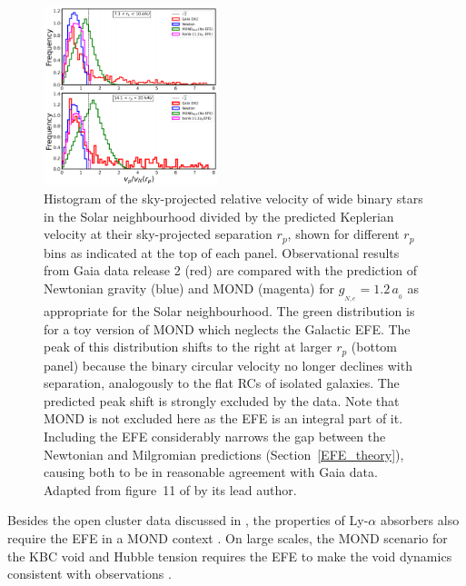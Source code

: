 \documentclass[fleqn,usenatbib,useAMS]{mnras} %
\begin{document}
\begin{figure}
	\centering
	\includegraphics[width=0.45\textwidth]{Pittordis_2019_Figure_11}
	\caption{Histogram of the sky-projected relative velocity of wide binary stars in the Solar neighbourhood divided by the predicted Keplerian velocity at their sky-projected separation $r_p$, shown for different $r_p$ bins as indicated at the top of each panel. Observational results from Gaia data release 2 (red) are compared with the prediction of Newtonian gravity (blue) and MOND (magenta) for $g_{_{N,e}} = 1.2 \, a_{_0}$ as appropriate for the Solar neighbourhood. The green distribution is for a toy version of MOND which neglects the Galactic EFE. The peak of this distribution shifts to the right at larger $r_p$ (bottom panel) because the binary circular velocity no longer declines with separation, analogously to the flat RCs of isolated galaxies. The predicted peak shift is strongly excluded by the data. Note that MOND is not excluded here as the EFE is an integral part of it. Including the EFE considerably narrows the gap between the Newtonian and Milgromian predictions (Section~\ref{EFE_theory}), causing both to be in reasonable agreement with Gaia data. Adapted from figure~11 of \citet{Pittordis_2019} by its lead author.}
	\label{Pittordis_2019_Figure_11}
\end{figure}

Besides the open cluster data discussed in \citet{Milgrom_1983}, the properties of Ly-$\alpha$ absorbers also require the EFE in a MOND context \citep[Section~\ref{Large_scale_structure}; see also][]{Aguirre_2001}. On large scales, the MOND scenario for the KBC void and Hubble tension requires the EFE to make the void dynamics consistent with observations \citep[Section~\ref{nuHDM_late}; see also the inference on the EFE in figure~4 of][]{Haslbauer_2020}.
\end{document}
